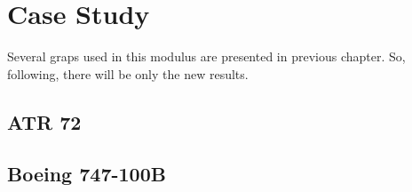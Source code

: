  
\section{Case Study}
Several graps used in this modulus are presented in previous chapter. So, following, there will be only the new results.

\subsection{ATR 72}


\subsection{Boeing 747-100B}
